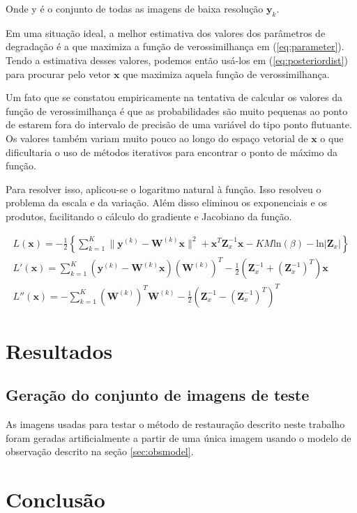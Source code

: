 \documentclass[12pt,openright,oneside,a4paper,english,brazil]{abntex2}
\begin{document}
Onde y é o conjunto de todas as imagens de baixa resolução $\mathbf{y}_k$.

Em uma situação ideal, a melhor estimativa dos valores dos parâmetros de degradação é a que maximiza a função de verossimilhança em (\ref{eq:parameter}).
Tendo a estimativa desses valores, podemos então usá-los em (\ref{eq:posteriordist}) para procurar pelo vetor $\mathbf{x}$ que maximiza aquela função de verossimilhança.

Um fato que se constatou empiricamente na tentativa de calcular os valores da função de verossimilhança é que as probabilidades são muito pequenas ao ponto de estarem fora do intervalo de precisão de uma variável do tipo ponto flutuante.
Os valores também variam muito pouco ao longo do espaço vetorial de $\mathbf{x}$ o que dificultaria o uso de métodos iterativos para encontrar o ponto de máximo da função.

Para resolver isso, aplicou-se o logaritmo natural à função. Isso resolveu o problema da escala e da variação.
Além disso eliminou os exponenciais e os produtos, facilitando o cálculo do gradiente e Jacobiano da função.

\begin{gather}
	L(\mathbf{x}) = -\frac{1}{2} \left\{ \sum^K_{k=1} \|\mathbf{y}^{(k)} - \mathbf{W}^{(k)} \mathbf{x} \|^2 + \mathbf{x}^T\mathbf{Z}^{-1}_x\mathbf{x} - KM\mathrm{ln}(\beta) - \mathrm{ln}|\mathbf{Z}_x| \right\} \\ 
	L'(\mathbf{x}) =  \sum^K_{k=1}  (\mathbf{y}^{(k)} - \mathbf{W}^{(k)}\mathbf{x})(\mathbf{W}^{(k)})^T  - \frac{1}{2}(\mathbf{Z}^{-1}_x + (\mathbf{Z}^{-1}_x)^T)\mathbf{x}  \\
	L''(\mathbf{x}) =  -\sum^K_{k=1} (\mathbf{W}^{(k)})^T\mathbf{W}^{(k)} - \frac{1}{2}(\mathbf{Z}^{-1}_x - (\mathbf{Z}^{-1}_x)^T)^T
\end{gather}

\chapter{Resultados}
\section{Geração do conjunto de imagens de teste}
As imagens usadas para testar o método de restauração descrito neste trabalho foram geradas artificialmente a partir de uma única imagem usando o modelo de observação descrito na seção \ref{sec:obsmodel}.


\chapter{Conclusão}

\postextual



\end{document}
